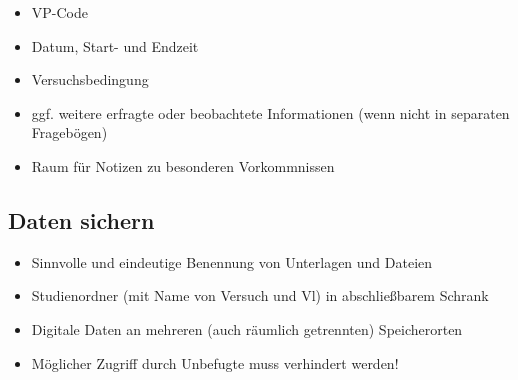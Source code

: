 \documentclass[
]{book}
\begin{document}
\begin{itemize}
\item
  VP-Code
\item
  Datum, Start- und Endzeit
\item
  Versuchsbedingung
\item
  ggf. weitere erfragte oder beobachtete Informationen (wenn nicht in separaten Fragebögen)
\item
  Raum für Notizen zu besonderen Vorkommnissen
\end{itemize}

\hypertarget{daten-sichern}{%
\subsection{Daten sichern}\label{daten-sichern}}

\begin{itemize}
\item
  Sinnvolle und eindeutige Benennung von Unterlagen und Dateien
\item
  Studienordner (mit Name von Versuch und Vl) in abschließbarem Schrank
\item
  Digitale Daten an mehreren (auch räumlich getrennten) Speicherorten
\item
  Möglicher Zugriff durch Unbefugte muss verhindert werden!
\end{itemize}

  
\end{document}
